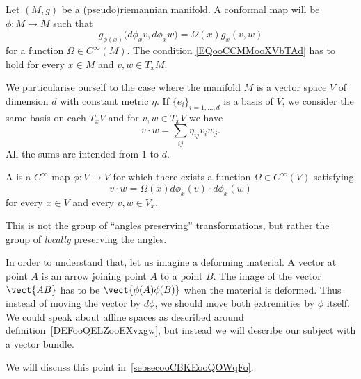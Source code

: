 \begin{definition}
	Let \( (M,g)\) be a (pseudo)riemannian manifold. A conformal map will be \( \phi\colon M\to M\) such that
	\begin{equation}        \label{EQooCCMMooXVbTAd}
		g_{\phi(x)}\big( d\phi_xv,d\phi_xw \big)=\Omega(x)g_x(v,w)
	\end{equation}
	for a function \( \Omega\in C^{\infty}(M)\). The condition \eqref{EQooCCMMooXVbTAd} has to hold for every \( x\in M\) and \( v,w\in T_xM\).
\end{definition}

We particularise ourself to the case where the manifold \( M\) is a vector space \( V\) of dimension \( d\) with constant metric \( \eta\). If \( \{ e_i \}_{i=1,\ldots, d}\) is a basis of \( V\), we consider the same basis on each \( T_xV\) and for \( v,w\in T_xV\) we have
\begin{equation}
	v\cdot w=\sum_{ij}\eta_{ij}v_iw_j.
\end{equation}
All the sums are intended from \( 1\) to \( d\).

\begin{definition}      \label{DEFooVKNBooFBWQQM}
	A  is a \(  C^{\infty}\) map \( \phi\colon V\to V\) for which there exists a function \( \Omega\in C^{\infty}(V)\) satisfying
	\begin{equation}        \label{EQooOZDUooCDaIrh}
		v\cdot w=\Omega(x) d\phi_x(v)\cdot d\phi_x(w)
	\end{equation}
	for every \( x\in V\) and every \( v,w\in V_x\).
\end{definition}


\begin{normaltext}  \label{NorooVEVOooRBpvXF}
	This is not the group of ``angles preserving'' transformations, but rather the group of \emph{locally} preserving the angles.

	In order to understand that, let us imagine a deforming material. A vector at point \( A\) is an arrow joining point \( A\) to a point \( B\). The image of the vector \( \vect{ AB }\) has to be \( \vect{ \phi(A)\phi(B) }\) when the material is deformed. Thus instead of moving the vector by \( d\phi\), we should move both extremities by \( \phi\) itself. We could speak about affine spaces as described around definition~\ref{DEFooQELZooEXvxgw}, but instead we will describe our subject with a vector bundle.

	We will discuss this point in~\ref{sebsecooCBKEooQOWqFo}.
\end{normaltext}

